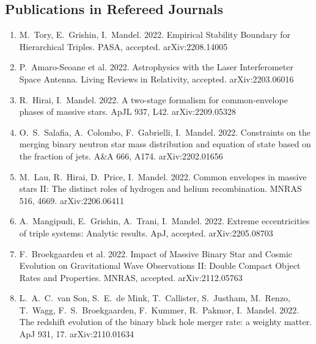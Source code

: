 \documentclass[margin,line]{res}
\begin{document}
\begin{resume}

\newpage

\section{\sc Publications in Refereed Journals}

\begin{enumerate}

\item M.~Tory, E.~Grishin, I.~Mandel. 2022. Empirical Stability Boundary for Hierarchical Triples. PASA, accepted.  arXiv:2208.14005

\item P.~Amaro-Seoane et al. 2022.  Astrophysics with the Laser Interferometer Space Antenna.  Living Reviews in Relativity, accepted.  arXiv:2203.06016

\item R.~Hirai, I.~Mandel. 2022.  A two-stage formalism for common-envelope phases of massive stars.  ApJL 937, L42.  arXiv:2209.05328

\item O.~S.~Salafia, A.~Colombo, F.~Gabrielli, I.~Mandel. 2022. Constraints on the merging binary neutron star mass distribution and equation of state based on the fraction of jets.  A\&A 666, A174. arXiv:2202.01656

\item M.~Lau, R.~Hirai, D.~Price, I.~Mandel.  2022.  Common envelopes in massive stars II: The distinct roles of hydrogen and helium recombination.  MNRAS 516, 4669. arXiv:2206.06411 

\item A.~Mangipudi, E.~Grishin, A.~Trani, I.~Mandel. 2022. Extreme eccentricities of triple systems: Analytic results.  ApJ, accepted.  arXiv:2205.08703

\item F.~Broekgaarden et al.  2022.  Impact of Massive Binary Star and Cosmic Evolution on Gravitational Wave Observations II: Double Compact Object Rates and Properties.  MNRAS, accepted.  arXiv:2112.05763

\item L.~A.~C.~van Son, S.~E.~de Mink, T.~Callister, S.~Justham, M.~Renzo, T.~Wagg, F.~S.~Broekgaarden, F.~Kummer, R.~Pakmor, I.~Mandel.  2022.  The redshift evolution of the binary black hole merger rate: a weighty matter.  ApJ 931, 17.  arXiv:2110.01634 


\end{enumerate}
\end{resume}
\end{document}
